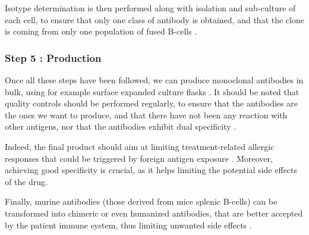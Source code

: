 Isotype determination is then performed along with isolation and sub-culture
of each cell, to ensure that only one class of antibody is obtained,
and that the clone is coming from only one population 
of fused B-cells \cite{nelson_monoclonal_2000}.

\subsubsection{Step 5 : Production}

Once all these steps have been followed, we can produce monoclonal
antibodies in bulk, using for example surface expanded culture flasks
\cite{nelson_monoclonal_2000}. It should be noted that quality controls
should be performed regularly, to ensure that the antibodies are the ones
we want to produce, and that there have not been any reaction with other
antigens, nor that the antibodies exhibit dual 
specificity \cite{nelson_monoclonal_2000}.

Indeed, the final product should aim at limiting treatment-related
allergic responses that could be triggered by foreign antigen exposure
\cite{national_research_council_us_committee_on_methods_of_producing_monoclonal_antibodies_large-scale_1999}.
Moreover, achieving good specificity is crucial, as it helps limiting the potential 
side effects of the drug.

Finally, murine antibodies (those derived from mice splenic B-cells)
can be transformed into chimeric or even humanized antibodies,
that are better accepted by the patient immune system, thus limiting
unwanted side effects \cite{noauthor_how_2020} \cite{ahmadzadeh_antibody_2014}.
